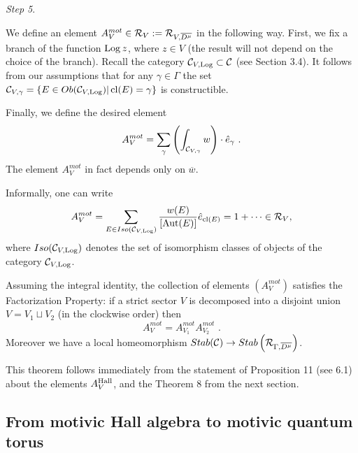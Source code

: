 \documentclass[12pt]{article}
\begin{document}
{\it Step 5}.

We define an element $A_V^{mot}\in {\cal R}_V:={\cal R}_{V,\overline{D^{\mu}}} $ in the following way. First, we fix a branch of the function $\operatorname{Log}z$, where $ z\in V$ (the result will not depend on the choice of the branch). Recall the category ${\mathcal C}_{V,\operatorname{Log}}\subset {\mathcal C}$ (see Section 3.4).
It follows from our assumptions that for any $\gamma\in \Gamma$ the set ${\mathcal C}_{V,\gamma}=\{E\in Ob({\mathcal C}_{V,\operatorname{Log}})|\operatorname{cl}(E)=\gamma\}$ is constructible.


Finally, we define the desired element
$$A_V^{mot}=\sum_{\gamma}\left(\int_{{\mathcal C}_{V,\gamma}}w \right)\cdot \hat{e}_{\gamma}\,\,.$$
The element $A_V^{mot}$ in fact depends only on $\overline{w}$.

Informally, one can write
$$A_V^{mot}=\sum_{E\in Iso({\mathcal C}_{V,\operatorname{Log}})}{w(E)\over {[\operatorname{Aut}(E)]}}\hat{e}_{\operatorname{cl}(E)}=1+\dots\in {\cal R}_V,$$
where $Iso({\mathcal C}_{V,\operatorname{Log}})$ denotes the set of isomorphism classes of objects of the category ${\mathcal C}_{V,\operatorname{Log}}$.


\begin{thm} Assuming  the integral identity, the collection of elements $(A_V^{mot})$ satisfies the Factorization Property:
if a strict sector $V$ is decomposed into a disjoint union $V=V_1\sqcup V_2$ (in the clockwise order) then
$$A_V^{mot}=A_{V_1}^{mot}A_{V_2}^{mot}\,\,. $$
Moreover we have a local homeomorphism $Stab({\mathcal C})\to Stab\left({\cal R}_{\Gamma,\overline{D^{\mu}}}\right)$.


\end{thm}

This theorem  follows immediately from the statement of Proposition 11 (see 6.1) about the elements $A_V^{\operatorname{Hall}}$, and 
  the Theorem 8 from the next section.























\subsection{From motivic Hall algebra to motivic quantum torus}
\end{document}
